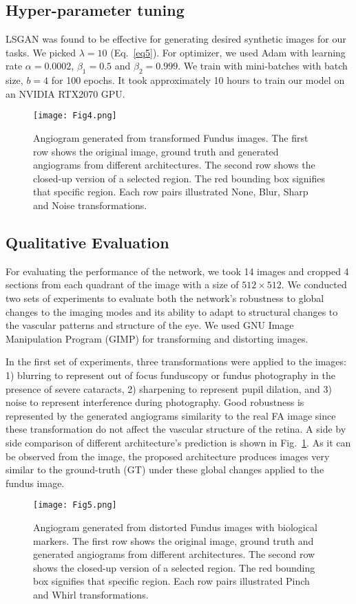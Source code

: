 \documentclass[runningheads]{llncs}
\begin{document}
\subsection{Hyper-parameter tuning}
\label{subsec:hyper}
LSGAN \cite{mao2017least} was found to be effective for generating desired synthetic images for our tasks. We picked $ \lambda =10$ (Eq.~\ref{eq5}). For optimizer, we used Adam with learning rate $\alpha=0.0002$, $\beta_1=0.5$ and $\beta_2=0.999$. We train with mini-batches with batch size, $b=4$ for 100 epochs. It took approximately 10 hours to train our model on an NVIDIA RTX2070 GPU.
\begin{figure}[h!t]
    \centering
    \texttt{[image: Fig4.png]}
    \caption{Angiogram generated from transformed Fundus images. The first row shows the original image, ground truth and generated angiograms from different architectures. The second row shows the closed-up version of a selected region. The red bounding box signifies that specific region. Each row pairs illustrated None, Blur, Sharp and Noise transformations.}
    \label{fig4}
\end{figure}
\subsection{Qualitative Evaluation}
\label{subsec:quant}
For evaluating the performance of the network, we took 14 images and cropped 4 sections from each quadrant of the image with a size of $512\times512$. We conducted two sets of experiments to evaluate both the network's robustness to global changes to the imaging modes and its ability to adapt to structural changes to the vascular patterns and structure of the eye. We used GNU Image Manipulation Program (GIMP) \cite{gimp2019gimp} for transforming and distorting images.
 
In the first set of experiments, three transformations were applied to the images: 1) blurring to represent out of focus funduscopy or fundus photography in the presence of severe cataracts, 2) sharpening to represent pupil dilation, and 3) noise to represent interference during photography. Good robustness is represented by the generated angiograms similarity to the real FA image since these transformation do not affect the vascular structure of the retina. A side by side comparison of different architecture's prediction is shown in Fig.~\ref{fig4}. As it can be observed from the image, the proposed architecture produces images very similar to the ground-truth (GT) under these global changes applied to the fundus image. 
\begin{figure}[t]
    \centering
    \texttt{[image: Fig5.png]}
    \caption{Angiogram generated from distorted Fundus images with biological markers. The first row shows the original image, ground truth and generated angiograms from different architectures. The second row shows the closed-up version of a selected region. The red bounding box signifies that specific region. Each row pairs illustrated Pinch and Whirl transformations.}
    \label{fig5}
\end{figure}
\end{document}
